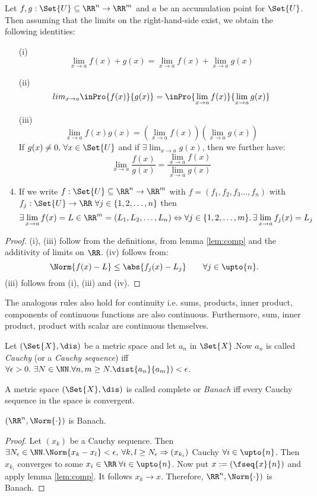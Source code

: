 \begin{thm}
 Let $f,g:\Set{U}\subseteq\RR^n\to\RR^m$ and $a$ be an accumulation point for $\Set{U}$. Then assuming that the limits on the right-hand-side exist, we obtain the following identities:
 \begin{enumerate}
  \item[(i)] $$\lim_{x\to a}f(x)+g(x)=\lim_{x\to a}f(x)+\lim_{x\to a}g(x)$$
  \item[(ii)] $$lim_{x\to a}\inPro{f(x)}{g(x)}=\inPro{\lim_{x\to a}f(x)}{\lim_{x\to a}g(x)}$$
  \item[(iii)] $$\lim_{x\to a}f(x)g(x)=\left(\lim_{x\to a}f(x)\right)\left(\lim_{x\to a}g(x)\right)$$
  If $g(x)\neq 0,\,\forall x\in\Set{U}$ and if $\exists \lim_{x\to a}g(x)$, then we further have:
  $$\lim_{x\to a}\frac{f(x)}{g(x)}=\frac{\lim_{x\to a}f(x)}{\lim_{x\to a}g(x)}$$
  \item If we write $f:\Set{U}\subseteq\RR^n\to\RR^m$ with $f=(f_1,f_2,f_3\ldots,f_n)$ with $f_j:\Set{U}\to\RR\ \forall j\in\{1,2,\ldots,n\}$ then $$\exists\lim_{x\to a}f(x)=L\in \RR^m=(L_1,L_2,\ldots,L_n)\Leftrightarrow \forall j\in\{1,2,\ldots,m\}.\,\exists\lim_{x\to a}f_j(x)=L_j$$
 \end{enumerate}
\end{thm}
\begin{proof}
 (i), (iii) follow from the definitions, from lemma \ref{lem:comp} and the additivity of limits on $\RR$.
 (iv) follows from: $$\Norm{f(x)-L}\leq \abs{f_j(x)-L_j}\qquad\forall j\in\upto{n}.$$
 (iii) follows from (i), (iii) and (iv).
\end{proof}
\begin{rem}
 The analogous rules also hold for continuity i.e. sums, products, inner product, components of continuous functions are also continuous. Furthermore, sum, inner product, product with scalar are continuous themselves.
\end{rem}
\begin{defn}
	Let $(\Set{X},\dis)$ be a metric space and let $a_n$ in $\Set{X}$.Now $a_n$ is called \emph{Cauchy} (or a \emph{Cauchy sequence}) iff $\forall \epsilon>0.\ \exists N\in\NN.\forall n,m\geq N.\dist{a_n}{a_m})<\epsilon$.
\end{defn}
\begin{defn}
	\label{defn:Banach}
	A metric space $(\Set{X},\dis)$ is called complete or \emph{Banach} iff every Cauchy sequence in the space is convergent.
\end{defn}
\begin{thm}
 $(\RR^n,\Norm{\cdot})$ is Banach.
\end{thm}
\begin{proof}
 Let $(x_k)$ be a Cauchy sequence. Then $\exists N_\epsilon\in\NN.\Norm{x_k-x_l}<\epsilon, \:\forall k,l \geq N_\epsilon\Rightarrow (x_{k_i})$ Cauchy $\forall i\in\upto{n}$. Then $x_{k_i}$ converges to some $x_i\in\RR\:\forall i\in\upto{n}$. Now put $x:=(\fseq{x}{n})$ and apply lemma \ref{lem:comp}. It follows $x_k\to x$. Therefore, $\RR^n, \Norm{\cdot})$ is Banach.
\end{proof}
